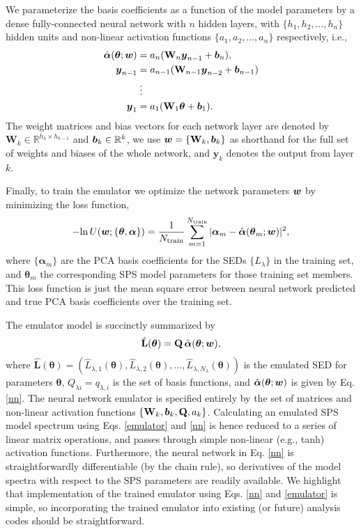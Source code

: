 \documentclass[twocolumn]{aastex62}
\newcommand{\vect}[1] {\mbox{\boldmath ${#1}$}}
\def\btheta{\boldsymbol{\theta}}
\def\ln{\mathrm{ln}}
\begin{document}
We parameterize the basis coefficients as a function of the model parameters by a dense fully-connected neural network with $n$ hidden layers, with $\{h_1, h_2,\dots,h_n\}$ hidden units and non-linear activation functions $\{a_1, a_2,\dots,a_n\}$ respectively, i.e., 
\begin{align}
\label{nn}
    \hat{\boldsymbol\alpha}(\btheta; \vect{w}) &= a_n(\mathbf{W}_n\vect{y}_{n-1} + \vect{b}_n), \nonumber \\
    \vect{y}_{n-1} &= a_{n-1}(\mathbf{W}_{n-1}\vect{y}_{n-2} + \vect{b}_{n-1}) \nonumber \\
    &\;\vdots \nonumber \\
    \vect{y}_1 &= a_1(\mathbf{W}_1\boldsymbol\theta + \vect{b}_1).
\end{align}
%
The weight matrices and bias vectors for each network layer are denoted by $\mathbf{W}_k\in\mathbb{R}^{h_k\times h_{k-1}}$ and $\vect{b}_k\in\mathbb{R}^k$, we use $\vect{w} = \{\mathbf{W}_k,\vect{b}_k\}$ as shorthand for the full set of weights and biases of the whole network, and $\mathbf{y}_k$ denotes the output from layer $k$.

Finally, to train the emulator we optimize the network parameters $\vect{w}$ by minimizing the loss function,
\begin{align}
    -\ln\,U(\vect{w} ; \{\btheta, \boldsymbol\alpha\}) = \frac{1}{N_\mathrm{train}} \sum_{m=1}^{N_\mathrm{train}} | \boldsymbol\alpha_m - \hat{\boldsymbol\alpha}(\btheta_m; \vect{w}) |^2,
\end{align}
where $\{\boldsymbol\alpha_m\}$ are the PCA basis coefficients for the SEDs $\{L_\lambda\}$ in the training set, and $\btheta_m$ the corresponding SPS model parameters for those training set members. This loss function is just the mean square error between neural network predicted and true PCA basis coefficients over the training set.

The emulator model is succinctly summarized by
\begin{align}
\label{emulator}
    \hat{\mathbf{L}}(\btheta) = \mathbf{Q}\,\hat{\boldsymbol\alpha}(\btheta ; \vect{w}),
\end{align}
where $\hat{\mathbf{L}}(\btheta) = (\hat{L}_{\lambda,1}(\btheta), \hat{L}_{\lambda,2}(\btheta), \dots, \hat{L}_{\lambda,{N_\lambda}}(\btheta))$ is the emulated SED for parameters $\btheta$, $Q_{\lambda i} = q_{\lambda,i}$ is the set of basis functions, and $\hat{\boldsymbol\alpha}(\btheta ; \vect{w})$ is given by Eq. \eqref{nn}. The neural network emulator is specified entirely by the set of matrices and non-linear activation functions $\{\mathbf{W}_k, \vect{b}_k, \mathbf{Q}, a_k\}$. Calculating an emulated SPS model spectrum using Eqs. \eqref{emulator} and \eqref{nn} is hence reduced to a series of linear matrix operations, and passes through simple non-linear (e.g., tanh) activation functions. Furthermore, the neural network in Eq. \eqref{nn} is straightforwardly differentiable (by the chain rule), so derivatives of the model spectra with respect to the SPS parameters are readily available. We highlight that implementation of the trained emulator using Eqs. \eqref{nn} and \eqref{emulator} is simple, so incorporating the trained emulator into existing (or future) analysis codes should be straightforward.
\end{document}
